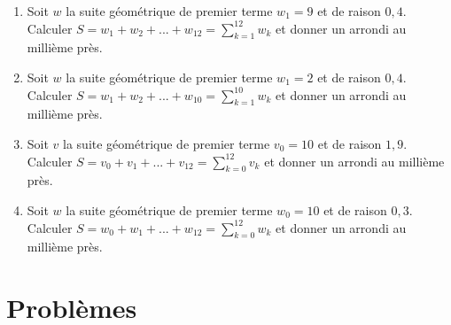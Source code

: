 \documentclass[11pt]{article}
\begin{document}
\begin{exercice}
\begin{enumerate}
	\item Soit $w$ la suite géométrique de premier terme $w_1 = 9$ et de raison $0{,}4$.\\Calculer $\displaystyle S = w_1 + w_2 + ... + w_{12} =\sum_{k=1}^{12}w_k$ et donner un arrondi au millième près.
	\item Soit $w$ la suite géométrique de premier terme $w_1 = 2$ et de raison $0{,}4$.\\Calculer $\displaystyle S = w_1 + w_2 + ... + w_{10} =\sum_{k=1}^{10}w_k$ et donner un arrondi au millième près.
	\item Soit $v$ la suite géométrique de premier terme $v_0 = 10$ et de raison $1{,}9$.\\Calculer $\displaystyle S = v_0 + v_1 + ... + v_{12} =\sum_{k=0}^{12}v_k$ et donner un arrondi au millième près.
	\item Soit $w$ la suite géométrique de premier terme $w_0 = 10$ et de raison $0{,}3$.\\Calculer $\displaystyle S = w_0 + w_1 + ... + w_{12} =\sum_{k=0}^{12}w_k$ et donner un arrondi au millième près.
\end{enumerate}
\end{exercice}

\newpage

\section{Problèmes}
\end{document}

